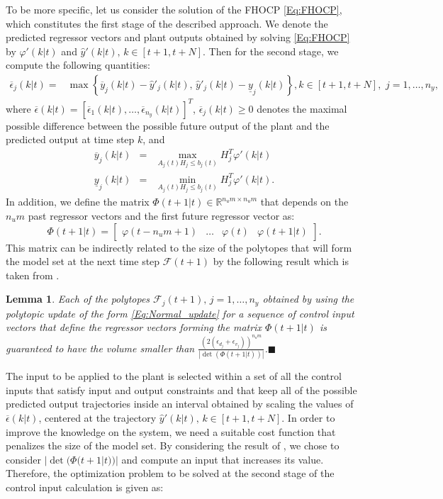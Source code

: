 \documentclass[10 pt, letterpaper]{article}
\newcommand{\beq}{\begin{equation}}
\newcommand{\eeq}{\end{equation}}
\newcommand{\ba}{\begin{array}}
\newcommand{\ea}{\end{array}}
\newcommand{\bR}{{\mathbb R}}
\newtheorem{lemma}{Lemma}[section]
\begin{document}
To be more specific, let us consider the solution of the FHOCP \eqref{Eq:FHOCP}, which constitutes the first stage of the described approach. We denote the predicted regressor vectors and plant outputs obtained by solving \eqref{Eq:FHOCP} by $\varphi'(k|t)$ and $\hat{y}'(k|t),\, k\in[t+1,t+N]$. Then for the second stage, we compute the following quantities:
\beq\label{Eq:bounds1}
\begin{aligned}
\overline{\epsilon}_j(k|t)=&\max \left\{ \overline{y}_j(k|t)-\hat{y}'_j(k|t),\, \hat{y}'_j(k|t)-\underline{y}_j(k|t) \right \}, k\in [t+1,t+N],\,\, j=1,\hdots, n_y,
\end{aligned}
\eeq
where $\overline{\epsilon}(k|t)=[\overline{\epsilon}_1(k|t),\hdots, \overline{\epsilon}_{n_y}(k|t)]^T$, $\overline{\epsilon}_j(k|t)\geq 0$ denotes the maximal possible difference between the possible future output of the plant and the predicted output at time step $k$, and 
\beq
\ba{ccc}
\overline{y}_j(k|t)&=&\max\limits_{A_j(t)H_j\leq b_j(t)} H_j^T\varphi'(k|t)\\
 \underline{y}_j(k|t)&=& \min\limits_{A_j(t)H_j\leq b_j(t)} H_j^T\varphi'(k|t). \ea
\eeq
In addition, we define the matrix $\Phi(t+1|t)\in \bR^{n_um\times n_um}$ that depends on the $n_um$ past regressor vectors and the first future regressor vector as:
\beq
\Phi(t+1|t)=\left[\ba{cccc} \varphi(t-n_um+1) &\hdots & \varphi(t) & \varphi(t+1|t) \ea \right].
\eeq
 This matrix can be indirectly related to the size of the polytopes that will form the model set at the next time step $\mathcal{F}(t+1)$ by the following result which is taken from \cite{id_aspect}.
\begin{lemma}\label{L:volume}
Each of the polytopes $\mathcal{F}_j(t+1),\, j=1,\hdots,n_y$ obtained by using the polytopic update of the form \eqref{Eq:Normal_update} for a sequence of control input vectors that define the regressor vectors forming the matrix $\Phi(t+1|t)$ is guaranteed to have the volume smaller than $\frac{\left(2(\epsilon_{d_j}+\epsilon_{v_j})\right)^{n_um}}{\left| \det\left( \Phi(t+1|t)\right)\right|}$.\hfill$\blacksquare$
\end{lemma}
The input to be applied to the plant is selected within a set of all the control inputs that satisfy input and output constraints and that keep all of the possible predicted output trajectories inside an interval obtained by scaling the values of $\overline{\epsilon}(k|t)$, centered at the trajectory $\hat{y}'(k|t),\, k\in[t+1,t+N]$.  In order to improve the knowledge on the system, we need a suitable cost function that penalizes the size of the model set. By considering the result of \cite{id_aspect}, we chose to consider $|\det(\Phi(t+1|t))|$ and compute an input that increases its value. Therefore, the optimization problem to be solved at the second stage of the control input calculation is given as:
\end{document}
